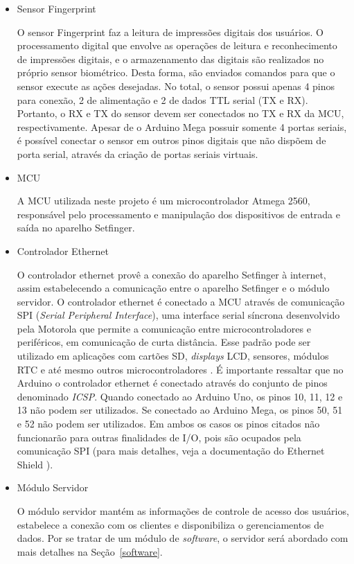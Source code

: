 \begin{itemize}
    
    \item Sensor Fingerprint
    
    O sensor Fingerprint faz a leitura de impressões digitais dos usuários. O processamento digital que envolve as operações de leitura e reconhecimento de impressões digitais, e o armazenamento das digitais são realizados no próprio sensor biométrico. Desta forma, são enviados comandos para que o sensor execute as ações desejadas. No total, o sensor possui apenas 4 pinos para conexão, 2 de alimentação e 2 de dados TTL serial (TX e RX). Portanto, o RX e TX do sensor devem ser conectados no TX e RX da MCU, respectivamente. Apesar de o Arduino Mega possuir somente 4 portas seriais, é possível conectar o sensor em outros pinos digitais que não dispõem de porta serial, através da criação de portas seriais virtuais. 
    
    \item MCU
    
    A MCU utilizada neste projeto é um microcontrolador Atmega 2560, responsável pelo processamento e manipulação dos dispositivos de entrada e saída no aparelho Setfinger.
    
    \item Controlador Ethernet
    
    O controlador ethernet provê a conexão do aparelho Setfinger à internet, assim estabelecendo a comunicação entre o aparelho Setfinger e o módulo servidor. O controlador ethernet é conectado a MCU através de comunicação SPI (\textit{Serial Peripheral Interface}), uma interface serial síncrona desenvolvido pela Motorola que permite a comunicação entre microcontroladores e periféricos, em comunicação de curta distância. Esse padrão pode ser utilizado em aplicações com cartões SD, \textit{displays} LCD, sensores, módulos RTC e até mesmo outros microcontroladores \cite{catsoulis2005designing, ganssle2007embedded, chattopadhyay2013embedded}. É importante ressaltar que no Arduino o controlador ethernet é conectado através do conjunto de pinos denominado \textit{ICSP}. Quando conectado ao Arduino Uno, os pinos 10, 11, 12 e 13 não podem ser utilizados. Se conectado ao Arduino Mega, os pinos 50, 51 e 52 não podem ser utilizados. Em ambos os casos os pinos citados não funcionarão para outras finalidades de I/O, pois são ocupados pela comunicação SPI (para mais detalhes, veja a documentação do Ethernet Shield \cite{ArduinoEthernetShield}).
    
    \item Módulo Servidor
    
    O módulo servidor mantém as informações de controle de acesso dos usuários, estabelece a conexão com os clientes e disponibiliza o gerenciamentos de dados. Por se tratar de um módulo de \textit{software}, o servidor será abordado com mais detalhes na Seção~\ref{software}.
    
\end{itemize}
  
